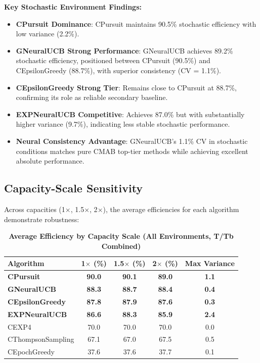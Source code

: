 \documentclass[12pt,a4paper]{article}
\newcommand{\performance}[1]{\textcolor{performancecolor}{\textbf{#1}}}
\newcommand{\stochastic}[1]{\textcolor{stochasticcolor}{\textbf{#1}}}
\newcommand{\legacy}[1]{\textcolor{legacycolor}{\textbf{#1}}}
\newcommand{\neural}[1]{\textcolor{neuralcolor}{\textbf{#1}}}
\begin{document}
\begin{tcolorbox}[colback=stochasticcolor!10,colframe=stochasticcolor,title=\textbf{Stochastic Environment Deep Analysis (1$\times$–2$\times$ Capacities, T/Tb Combined)}]
\textbf{Key Stochastic Environment Findings:}
\begin{itemize}
\item \stochastic{CPursuit Dominance}: CPursuit maintains 90.5\% stochastic efficiency with low variance (2.2\%).
\item \neural{GNeuralUCB Strong Performance}: GNeuralUCB achieves 89.2\% stochastic efficiency, positioned between CPursuit (90.5\%) and CEpsilonGreedy (88.7\%), with superior consistency (CV = 1.1\%).
\item \performance{CEpsilonGreedy Strong Tier}: Remains close to CPursuit at 88.7\%, confirming its role as reliable secondary baseline.
\item \legacy{EXPNeuralUCB Competitive}: Achieves 87.0\% but with substantially higher variance (9.7\%), indicating less stable stochastic performance.
\item \neural{Neural Consistency Advantage}: GNeuralUCB's 1.1\% CV in stochastic conditions matches pure CMAB top-tier methods while achieving excellent absolute performance.
\end{itemize}

\end{tcolorbox}

\subsection{Capacity-Scale Sensitivity}

Across capacities (1$\times$, 1.5$\times$, 2$\times$), the average efficiencies for each algorithm demonstrate robustness:

\begin{table}[H]
\centering
\caption{\performance{Average Efficiency by Capacity Scale (All Environments, T/Tb Combined)}}
\begin{tabular}{|l|c|c|c|c|}
\hline
\textbf{Algorithm} & \textbf{1$\times$ (\%)} & \textbf{1.5$\times$ (\%)} & \textbf{2$\times$ (\%)} & \textbf{Max Variance} \\
\hline
\hline
\performance{CPursuit}        & \performance{90.0} & \performance{90.1} & \performance{89.0} & \performance{1.1} \\
\neural{GNeuralUCB}          & \neural{88.3} & \neural{88.7} & \neural{88.4} & \neural{0.4} \\
\performance{CEpsilonGreedy} & \performance{87.8} & \performance{87.9} & \performance{87.6} & \performance{0.3} \\
\legacy{EXPNeuralUCB}        & \legacy{86.6}     & \legacy{88.3}     & \legacy{85.9} & \legacy{2.4} \\
CEXP4                        & 70.0              & 70.0              & 70.0 & 0.0 \\
CThompsonSampling            & 67.1              & 67.0              & 67.5 & 0.5 \\
CEpochGreedy                 & 37.6              & 37.6              & 37.7 & 0.1 \\
\hline
\end{tabular}
\end{table}
\end{document}
